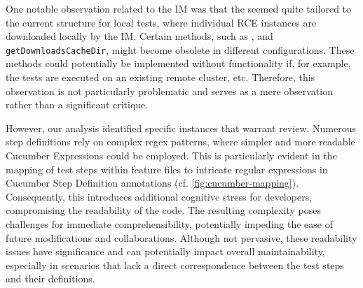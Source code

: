 One notable observation related to the \ac{IM} was that the \texttt{} seemed quite tailored to the current structure for local tests, where individual \ac{RCE} instances are downloaded locally by the \ac{IM}. Certain methods, such as \texttt{}, and \texttt{getDownloadsCacheDir}, might become obsolete in different configurations. These methods could potentially be implemented without functionality if, for example, the tests are executed on an existing remote cluster, etc. Therefore, this observation is not particularly problematic and serves as a mere observation rather than a significant critique.

However, our analysis identified specific instances that warrant review. Numerous step definitions rely on complex regex patterns, where simpler and more readable Cucumber Expressions could be employed. This is particularly evident in the mapping of test steps within feature files to intricate regular expressions in Cucumber Step Definition annotations (cf. \cref{fig:cucumber-mapping}). Consequently, this introduces additional cognitive stress for developers, compromising the readability of the code. The resulting complexity poses challenges for immediate comprehensibility, potentially impeding the ease of future modifications and collaborations. Although not pervasive, these readability issues have significance and can potentially impact overall maintainability, especially in scenarios that lack a direct correspondence between the test steps and their definitions.